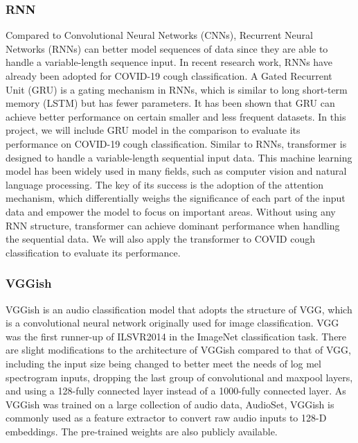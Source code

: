 \documentclass[11pt]{article}
\begin{document}
\subsubsection{RNN}
Compared to Convolutional Neural Networks (CNNs), Recurrent Neural Networks (RNNs) can better
model sequences of data since they are able to handle a variable-length sequence input.
In recent research work\cite{Yang1st,Yang2nd}, RNNs have already been adopted for COVID-19 cough classification.
A Gated Recurrent Unit (GRU) is a gating mechanism in RNNs\cite{Wang2nd}, which is similar to long
short-term memory (LSTM) but has fewer parameters. It has been shown that GRU can achieve better
performance on certain smaller and less frequent datasets\cite{Yang4th}. In this project, we will include
GRU model in the comparison to evaluate its performance on COVID-19 cough classification.
Similar to RNNs, transformer\cite{Yang5th} is designed to handle a variable-length sequential input data.
This machine learning model has been widely used in many fields, such as computer vision and
natural language processing. The key of its success is the adoption of the attention mechanism,
which differentially weighs the significance of each part of the input data and empower the model
to focus on important areas. Without using any RNN structure, transformer can achieve dominant
performance when handling the sequential data. We will also apply the transformer to COVID cough
classification to evaluate its performance.

\subsubsection{VGGish}
VGGish\cite{Chao1st} is an audio classification model that adopts the structure of VGG\cite{Chao2nd}, which is a
convolutional neural network originally used for image classification. VGG was the first runner-up of
ILSVR2014 in the ImageNet classification task. There are slight modifications to the architecture of
VGGish compared to that of VGG, including the input size being changed to better meet the needs of
log mel spectrogram inputs, dropping the last group of convolutional and maxpool layers, and using
a 128-fully connected layer instead of a 1000-fully connected layer. As VGGish was trained on a large
collection of audio data, AudioSet\cite{Chao3rd}, VGGish is commonly used as a feature extractor to convert
raw audio inputs to 128-D embeddings. The pre-trained weights are also publicly available. \\
\end{document}
